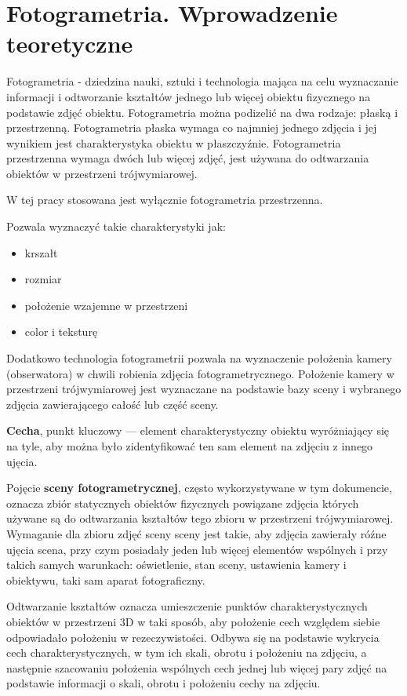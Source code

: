 \graphicspath{ {./img/2_Theory/} }


\chapter{Fotogrametria. Wprowadzenie teoretyczne}

Fotogrametria - dziedzina nauki, sztuki i technologia mająca na celu wyznaczanie informacji i odtworzanie kształtów jednego lub więcej obiektu fizycznego na podstawie zdjęć obiektu.
Fotogrametria można podizelić na dwa rodzaje: płaską i przestrzenną. Fotogrametria płaska wymaga co najmniej jednego zdjęcia i jej wynikiem jest charakterystyka obiektu w płaszczyźnie. Fotogrametria przestrzenna wymaga dwóch lub więcej zdjęć, jest używana do odtwarzania obiektów w przestrzeni trójwymiarowej.

W tej pracy stosowana jest wyłącznie fotogrametria przestrzenna.

Pozwala wyznaczyć takie charakterystyki jak:
\begin{itemize}
   \item krszałt
   \item rozmiar
   \item położenie wzajemne w przestrzeni
   \item color i teksturę
\end{itemize}

Dodatkowo technologia fotogrametrii pozwala na wyznaczenie położenia kamery (obserwatora) w chwili robienia zdjęcia fotogrametrycznego.
Położenie kamery w przestrzeni trójwymiarowej jest wyznaczane na podstawie bazy sceny i wybranego zdjęcia zawierającego całość lub część sceny.

\textbf{Cecha}, punkt kluczowy --- element charakterystyczny obiektu wyróżniający się na tyle, aby można było zidentyfikować ten sam element na zdjęciu z innego ujęcia.

Pojęcie \textbf{sceny fotogrametrycznej}, często wykorzystywane w tym dokumencie, oznacza zbiór statycznych obiektów fizycznych powiązane zdjęcia których używane są do odtwarzania kształtów tego zbioru w przestrzeni trójwymiarowej. Wymaganie dla zbioru zdjęć sceny sceny jest takie, aby zdjęcia zawierały róźne ujęcia scena, przy czym posiadały jeden lub więcej elementów wspólnych i przy takich samych warunkach: oświetlenie, stan sceny, ustawienia kamery i obiektywu, taki sam aparat fotograficzny.

Odtwarzanie kształtów oznacza umieszczenie punktów charakterystycznych obiektów w przestrzeni 3D w taki sposób, aby położenie cech względem siebie odpowiadało położeniu w rezeczywistości. Odbywa się na podstawie wykrycia cech charakterystycznych, w tym ich skali, obrotu i położeniu na zdjęciu, a następnie szacowaniu położenia wspólnych cech jednej lub więcej pary zdjęć na podstawie informacji o skali, obrotu i położeniu cechy na zdjęciu.

